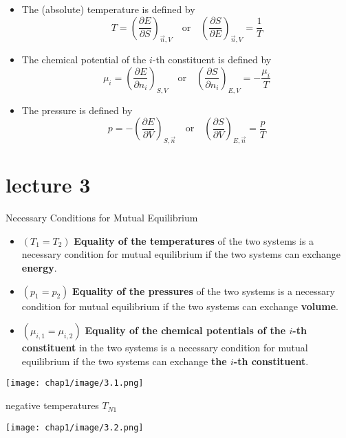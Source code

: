 \begin{defn}
    \par\indent
    \begin{itemize}
        \item The (absolute) temperature is defined by  
        \[
        T = \left( \frac{\partial E}{\partial S} \right)_{\vec{n}, V} \quad \text{or} \quad \left( \frac{\partial S}{\partial E} \right)_{\vec{n}, V} = \frac{1}{T}
        \]          
        \item The chemical potential of the \(i\)-th constituent is defined by  
        \[
        \mu_i = \left( \frac{\partial E}{\partial n_i} \right)_{S, V} \quad \text{or} \quad \left( \frac{\partial S}{\partial n_i} \right)_{E, V} = -\frac{\mu_i}{T}
        \]          
        \item The pressure is defined by  
        \[
        p = - \left( \frac{\partial E}{\partial V} \right)_{S, \vec{n}} \quad \text{or} \quad \left( \frac{\partial S}{\partial V} \right)_{E, \vec{n}} = \frac{p}{T}
        \]
    \end{itemize}
\end{defn}
\section{lecture 3}
\begin{proposition}
    Necessary Conditions for Mutual Equilibrium
    \begin{itemize}
        \item \((T_1=T_2)\)
        \textbf{Equality of the temperatures} of the two systems is a necessary condition for mutual equilibrium if the two systems can exchange \textbf{energy}.
        \item \((p_1=p_2)\)
        \textbf{Equality of the pressures} of the two systems is a necessary condition for mutual equilibrium if the two systems can exchange \textbf{volume}.
        \item \((\mu_{i,1} = \mu_{i,2})\)
        \textbf{Equality of the chemical potentials of the \(i\)-th constituent} in the two systems is a necessary condition for mutual equilibrium if the two systems can exchange \textbf{the \(i\)-th constituent}.
    \end{itemize}
\end{proposition}
\begin{minipage}{0.8\textwidth}
    \centering
    \texttt{[image: chap1/image/3.1.png]}
\end{minipage}
\begin{defn}
    negative temperatures \(T_{N1}\)

\begin{minipage}{0.8\textwidth}
    \centering
    \texttt{[image: chap1/image/3.2.png]}
\end{minipage}
\end{defn}
